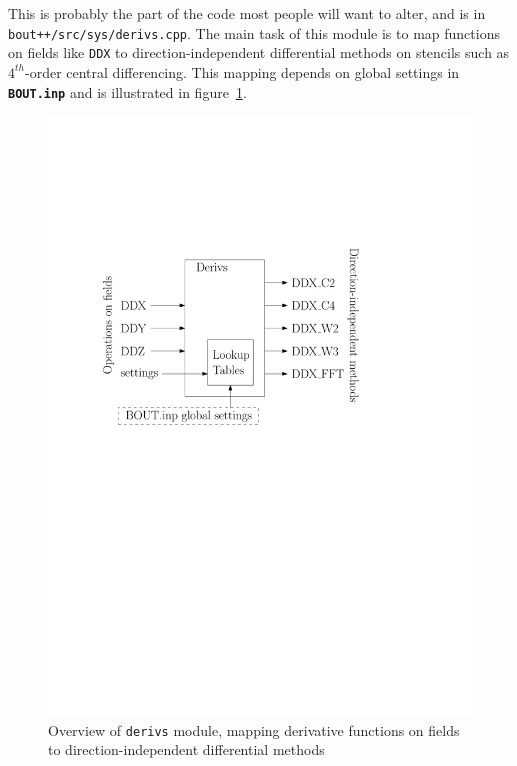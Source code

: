 \documentclass[12pt]{article}
\newcommand{\code}[1]{\texttt{#1}}
\newcommand{\file}[1]{\texttt{\bf #1}}
\begin{document}
This is probably the part of the code most people will want to alter, and is
in \texttt{bout++/src/sys/derivs.cpp}. The main
task of this module is to map functions on fields like \code{DDX}
to direction-independent differential methods on stencils such as
$4^{th}$-order central differencing. This mapping depends on global
settings in \file{BOUT.inp} and is illustrated in figure~\ref{fig:diffOverview}.
\begin{figure}[htb!]
\centering
\includegraphics[scale=0.75]{figs/diffOverview.pdf}
\caption{Overview of \code{derivs} module, mapping derivative functions on fields to direction-independent differential methods}
\label{fig:diffOverview}
\end{figure}
\end{document}
